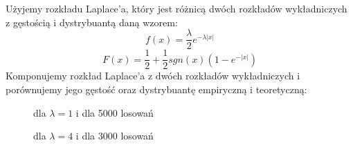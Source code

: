\documentclass{article}
\begin{document}
\begin{enumerate}
		Użyjemy rozkładu Laplace'a, który jest różnicą dwóch rozkładów wykładniczych z gęstością i dystrybuantą daną wzorem:
		$$f(x) = \frac{\lambda}{2}e^{-\lambda|x|}$$
		$$F(x) = \frac{1}{2} + \frac{1}{2}sgn(x)(1 - e^{-|x|})$$
		Komponujemy rozkład Laplace'a z dwóch rozkładów wykładniczych i porównujemy jego gęstość oraz dystrybuantę empiryczną i teoretyczną:
		\begin{figure}[h]
			\begin{center}
				\caption{dla $\lambda = 1$ i dla 5000 losowań}
				\caption{dla $\lambda = 4$ i dla 3000 losowań}
			\end{center}
		\end{figure}
		\begin{figure}[h]
			\begin{center}
\end{center}
\end{figure}
\end{enumerate}
\end{document}
